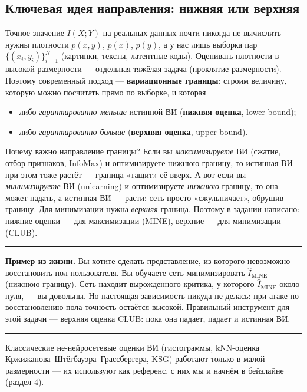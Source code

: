 \documentclass[11pt]{article}
\newcommand{\MI}{I(X;Y)}
\newenvironment{exbox}{%
  \par\medskip\noindent
  \begin{minipage}[t]{\linewidth}
  \color{accent}\rule[2pt]{\linewidth}{0.6pt}\color{black}
  \vspace{0.4em}\noindent\small
}{%
  \vspace{0.4em}
  \color{accent}\rule[2pt]{\linewidth}{0.6pt}\color{black}
  \end{minipage}\par\medskip
}
\begin{document}
\subsection{Ключевая идея направления: нижняя или верхняя}

Точное значение $\MI$ на реальных данных почти никогда не вычислить — нужны плотности $p(x,y)$, $p(x)$, $p(y)$, а у нас лишь выборка пар $\{(x_i,y_i)\}_{i=1}^N$ (картинки, тексты, латентные коды). Оценивать плотности в высокой размерности — отдельная тяжёлая задача (проклятие размерности). Поэтому современный подход — \textbf{вариационные границы}: строим величину, которую можно посчитать прямо по выборке, и которая

\begin{itemize}
\item либо \emph{гарантированно меньше} истинной ВИ (\textbf{нижняя оценка}, lower bound);
\item либо \emph{гарантированно больше} (\textbf{верхняя оценка}, upper bound).
\end{itemize}

Почему важно направление границы? Если вы \emph{максимизируете} ВИ (сжатие, отбор признаков, InfoMax) и оптимизируете нижнюю границу, то истинная ВИ при этом тоже растёт — граница «тащит» её вверх. А вот если вы \emph{минимизируете} ВИ (unlearning) и оптимизируете \emph{нижнюю} границу, то она может падать, а истинная ВИ — расти: сеть просто «сжульничает», обрушив границу. Для минимизации нужна \emph{верхняя} граница. Поэтому в задании написано: нижние оценки — для максимизации (MINE), верхние — для минимизации (CLUB).

\begin{exbox}
\textbf{Пример из жизни.} Вы хотите сделать представление, из которого невозможно восстановить пол пользователя. Вы обучаете сеть минимизировать $\hat I_\text{MINE}$ (нижнюю границу). Сеть находит вырожденного критика, у которого $\hat I_\text{MINE}$ около нуля, — вы довольны. Но настоящая зависимость никуда не делась: при атаке по восстановлению пола точность остаётся высокой. Правильный инструмент для этой задачи — верхняя оценка CLUB: пока она падает, падает и истинная ВИ.
\end{exbox}

Классические не-нейросетевые оценки ВИ (гистограммы, kNN-оценка Кржижанова–Штёгбауэра–Грассбергера, KSG) работают только в малой размерности — их используют как референс, с них мы и начнём в бейзлайне (раздел 4).

\end{document}
